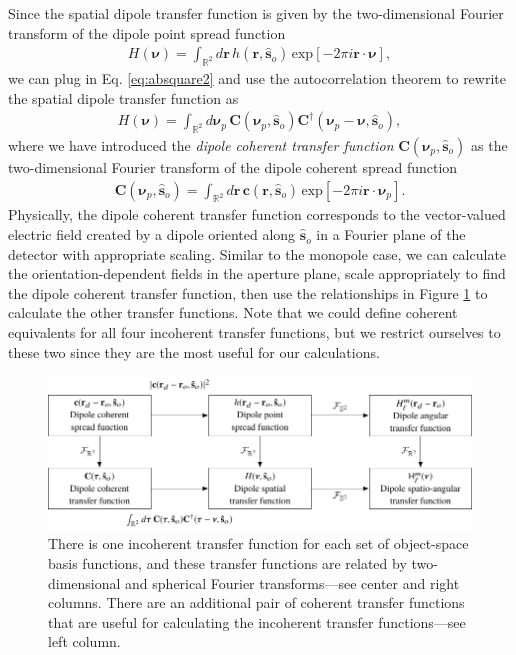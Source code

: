 \documentclass[]{osa-article}
\providecommand{\mb}[1]{\mathbf{#1}}
\providecommand{\so}{\mathbf{\hat{s}}_o}
\providecommand{\mbb}[1]{\mathbb{#1}}
\providecommand{\bs}[1]{\boldsymbol{#1}}
\providecommand{\bv}{\bs{\nu}}
\providecommand{\bvp}{\bs{\nu}_p}
\begin{document}
Since the spatial dipole transfer function is given by the two-dimensional
Fourier transform of the dipole point spread function
\begin{align}
  H(\bv) = \int_{\mbb{R}^2}d\mb{r}\,h(\mb{r}, \so)\,\text{exp}[-2\pi i\mb{r}\cdot\bv],
\end{align}
we can plug in Eq. \ref{eq:absquare2} and use the autocorrelation theorem to
rewrite the spatial dipole transfer function as 
\begin{align}
  H(\bv) = \int_{\mbb{R}^2}d\bvp\,\mb{C}(\bvp, \so)\mb{C}^\dagger(\bvp - \bv, \so), 
\end{align}
where we have introduced the \textit{dipole coherent transfer function}
$\mb{C}(\bvp, \so)$ as the two-dimensional Fourier transform of the dipole
coherent spread function
\begin{align}
  \mb{C}(\bvp, \so) = \int_{\mbb{R}^2}d\mb{r}\, \mb{c}(\mb{r}, \so)\,\text{exp}[-2\pi i\mb{r}\cdot\bvp].
\end{align}
Physically, the dipole coherent transfer function corresponds to the
vector-valued electric field created by a dipole oriented along $\so$ in a
Fourier plane of the detector with appropriate scaling. Similar to the monopole
case, we can calculate the orientation-dependent fields in the aperture plane,
scale appropriately to find the dipole coherent transfer function, then use the
relationships in Figure \ref{fig:transfer-functions} to calculate the other
transfer functions. Note that we could define coherent equivalents for all four
incoherent transfer functions, but we restrict ourselves to these two since they
are the most useful for our calculations.

\begin{figure}
  \hspace{-2em}
  \includegraphics[scale=1.0]{../figures/transfer-functions/transfer-functions.pdf}
  \caption{There is one incoherent transfer function for each set of
    object-space basis functions, and these transfer functions are related by
    two-dimensional and spherical Fourier transforms---see center and right
    columns. There are an additional pair of coherent transfer functions that
    are useful for calculating the incoherent transfer functions---see left column.}
   \label{fig:transfer-functions}
 \end{figure}
    
\end{document}

